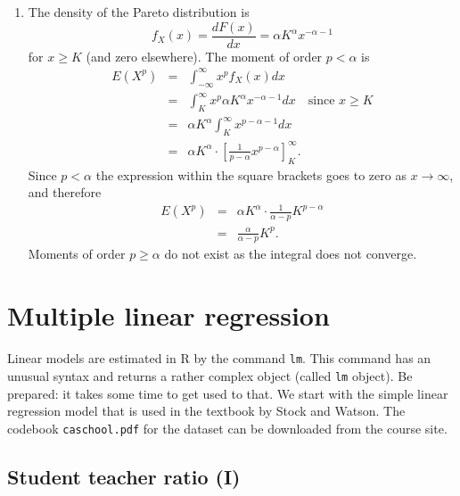 \documentclass{article}
\begin{document}
\begin{solution}
\begin{enumerate}
\item The density of the Pareto distribution is%
\begin{equation*}
f_{X}(x)=\frac{dF(x)}{dx}=\alpha K^\alpha x^{-\alpha -1}
\end{equation*}%
for $x\geq K$ (and zero elsewhere). The moment of order $%
p<\alpha $ is%
\begin{eqnarray*}
E\left( X^{p}\right)  &=&\int_{-\infty }^{\infty }x^{p}f_{X}(x)dx \\
&=&\int_{K}^{\infty }x^{p}\alpha K^\alpha x^{-\alpha -1}dx \quad\text{since } x\geq K\\
&=&\alpha K^\alpha\int_{K}^{\infty }x^{p-\alpha -1}dx \\
&=&\alpha K^\alpha\cdot \left[ \frac{1}{p-\alpha }x^{p-\alpha }\right]
_{K}^{\infty }.
\end{eqnarray*}%
Since $p<\alpha $ the expression within the square brackets goes to zero as $%
x\rightarrow \infty $, and therefore%
\begin{eqnarray*}
E\left( X^{p}\right)  &=&\alpha K^\alpha\cdot \frac{1}{\alpha -p} K^{p-\alpha } \\
&=&\frac{\alpha }{\alpha -p}K^{p}.
\end{eqnarray*}%
Moments of order $p\geq \alpha $ do not exist as the integral does not
converge.
\end{enumerate}
\end{solution}
\newpage

\section{Multiple linear regression\label{repetition2}}

Linear models are estimated in R by the command \texttt{lm}. This command
has an unusual syntax and returns a rather complex object (called \texttt{lm}
object). Be prepared: it takes some time to get used to that. We start with
the simple linear regression model that is used in the textbook by Stock and
Watson. The codebook \texttt{caschool.pdf} for the dataset can be downloaded
from the course site.

\subsection{Student teacher ratio (I)}
\end{document}

